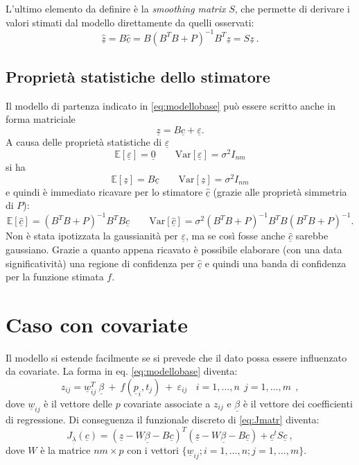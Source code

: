 \documentclass[a4paper,11pt,twoside,openright]{book}							%
\begin{document}
L'ultimo elemento da definire è la \textit{smoothing matrix} $S$, che permette di derivare i valori stimati dal modello direttamente da quelli osservati:
$$
\hat  {\underline z} =B\hat  {\underline c} = B(B^T B + P)^{-1}B^T \underline z = S\underline{z} \ .
$$



\subsection{Proprietà statistiche dello stimatore}
Il modello di partenza indicato in \ref{eq:modellobase} può essere scritto anche in forma matriciale
\begin{equation}
\label{eq:modellobasematric}
\underline z=B \underline c + \underline \varepsilon .
\end{equation}
A causa delle proprietà statistiche di $\underline \varepsilon$
$$
\mathbb{E}[\underline \varepsilon] = \underline 0 \qquad \mathrm{Var}[\underline \varepsilon] = \sigma^2 I_{nm}
$$
si ha
$$
\mathbb{E}[\underline z] = B \underline c \qquad \mathrm{Var}[\underline z] = \sigma^2 I_{nm}
$$
e quindi è immediato ricavare per lo stimatore $\hat  {\underline c}$ (grazie alle proprietà simmetria di $P$):
$$
\mathbb{E}[\hat  {\underline c}] = (B^T B + P)^{-1}B^TB \underline c \qquad \mathrm{Var}[\hat  {\underline c}] = \sigma^2 (B^T B + P)^{-1}B^TB(B^T B + P)^{-1} .
$$
Non è stata ipotizzata la gaussianità per $\underline \varepsilon$, ma se così fosse anche $\hat  {\underline c}$ sarebbe gaussiano. Grazie a quanto appena ricavato è possibile elaborare (con una data significatività) una regione di confidenza per $\hat  {\underline c}$ e quindi una banda di confidenza per la funzione stimata $f$.


\section{Caso con covariate}
\label{sez:beta}
Il modello si estende facilmente se si prevede che il dato possa essere influenzato da covariate. La forma in eq. \ref{eq:modellobase} diventa:
\begin{equation}
\label{eq:modellobasecovar}
z_{ij}= \underline w_{ij}^T\  \underline \beta   \ + \  f(\underline p_i,t_j)\ +\ \varepsilon_{ij}\ \ \ \ i = 1,\ldots,n\ \ j=1,\ldots,m \ \ ,
\end{equation}
dove $\underline w_{ij}$ è il vettore delle $p$ covariate associate a $z_{ij}$ e $\underline \beta$ è il vettore dei coefficienti di regressione. Di conseguenza il funzionale discreto di \ref{eq:Jmatr} diventa:
$$ J_{\underline \lambda }(\underline c) = (\underline z - W \underline \beta - B \underline c)^T (\underline z - W \underline \beta - B \underline c) + \underline c^t S \underline c  \ ,$$
dove $W$ è la matrice $nm \times p$ con i vettori $ \{\underline w_{ij}; i=1,\ldots,n;j=1,\ldots,m\}$.
\end{document}
